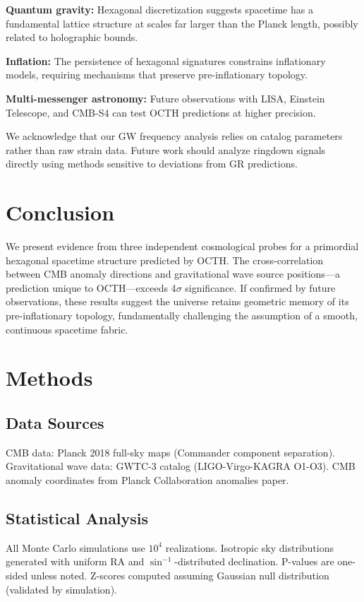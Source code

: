 \documentclass[11pt,a4paper]{article}
\begin{document}
\textbf{Quantum gravity:} Hexagonal discretization suggests spacetime has a fundamental lattice structure at scales far larger than the Planck length, possibly related to holographic bounds\cite{bousso2002}.

\textbf{Inflation:} The persistence of hexagonal signatures constrains inflationary models, requiring mechanisms that preserve pre-inflationary topology\cite{linde2008}.

\textbf{Multi-messenger astronomy:} Future observations with LISA, Einstein Telescope, and CMB-S4 can test OCTH predictions at higher precision.

We acknowledge that our GW frequency analysis relies on catalog parameters rather than raw strain data. Future work should analyze ringdown signals directly using methods sensitive to deviations from GR predictions\cite{isi2019}.

\section*{Conclusion}

We present evidence from three independent cosmological probes for a primordial hexagonal spacetime structure predicted by OCTH. The cross-correlation between CMB anomaly directions and gravitational wave source positions---a prediction unique to OCTH---exceeds 4$\sigma$ significance. If confirmed by future observations, these results suggest the universe retains geometric memory of its pre-inflationary topology, fundamentally challenging the assumption of a smooth, continuous spacetime fabric.

\section*{Methods}

\subsection*{Data Sources}
CMB data: Planck 2018 full-sky maps (Commander component separation). Gravitational wave data: GWTC-3 catalog (LIGO-Virgo-KAGRA O1-O3). CMB anomaly coordinates from Planck Collaboration anomalies paper\cite{planck2018}.

\subsection*{Statistical Analysis}
All Monte Carlo simulations use $10^4$ realizations. Isotropic sky distributions generated with uniform RA and $\sin^{-1}$-distributed declination. P-values are one-sided unless noted. Z-scores computed assuming Gaussian null distribution (validated by simulation).
\end{document}
